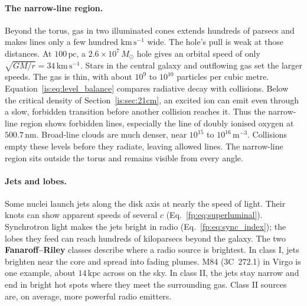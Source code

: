 \paragraph{The narrow-line region.} Beyond the torus, gas in two illuminated cones extends hundreds of parsecs and makes lines only a few hundred $\mathrm{km\,s^{-1}}$ wide. The hole's pull is weak at those distances. At $100\,\mathrm{pc}$, a $2.6\times10^7\,M_\odot$ hole gives an orbital speed of only $\sqrt{GM/r}=34\,\mathrm{km\,s^{-1}}$. Stars in the central galaxy and outflowing gas set the larger speeds. The gas is thin, with about $10^9$ to $10^{10}$ particles per cubic metre. Equation~\eqref{is:eq:level_balance} compares radiative decay with collisions. Below the critical density of Section~\ref{is:sec:21cm}, an excited ion can emit even through a slow, forbidden transition before another collision reaches it. Thus the narrow-line region shows forbidden lines, especially the line of doubly ionised oxygen at $500.7\,\mathrm{nm}$. Broad-line clouds are much denser, near $10^{15}$ to $10^{16}\,\mathrm{m^{-3}}$. Collisions empty these levels before they radiate, leaving allowed lines. The narrow-line region sits outside the torus and remains visible from every angle.

\paragraph{Jets and lobes.} Some nuclei launch jets along the disk axis at nearly the speed of light. Their knots can show apparent speeds of several $c$ (Eq.~\eqref{fp:eq:superluminal}). Synchrotron light makes the jets bright in radio (Eq.~\eqref{fp:eq:sync_index}); the lobes they feed can reach hundreds of kiloparsecs beyond the galaxy. The two \textbf{Fanaroff--Riley} classes describe where a radio source is brightest. In class I, jets brighten near the core and spread into fading plumes. M84 (3C~272.1) in Virgo is one example, about $14\,\mathrm{kpc}$ across on the sky. In class II, the jets stay narrow and end in bright hot spots where they meet the surrounding gas. Class II sources are, on average, more powerful radio emitters.

